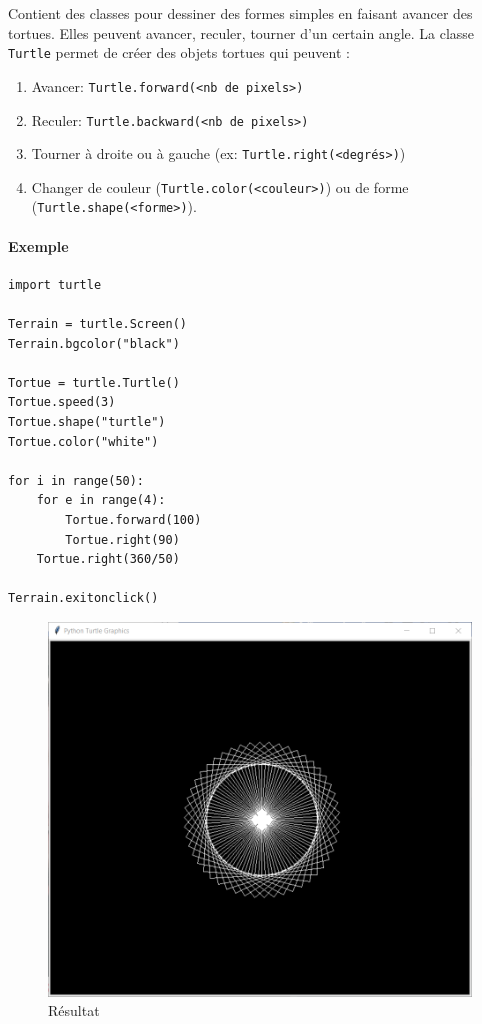 \documentclass[a4paper, 10pt]{article}
\begin{document}
Contient des classes pour dessiner des formes simples en faisant avancer des tortues. Elles peuvent avancer, reculer, tourner d'un certain angle.
La classe \texttt{Turtle} permet de créer des objets tortues qui peuvent :
\begin{enumerate}
        \item Avancer: \texttt{Turtle.forward(<nb de pixels>)}
        \item Reculer: \texttt{Turtle.backward(<nb de pixels>)}
        \item Tourner à droite ou à gauche (ex: \texttt{Turtle.right(<degrés>)})
        \item Changer de couleur (\texttt{Turtle.color(<couleur>)}) ou de forme (\texttt{Turtle.shape(<forme>)}).
\end{enumerate}

\paragraph{Exemple}
\begin{verbatim}
import turtle

Terrain = turtle.Screen()
Terrain.bgcolor("black")

Tortue = turtle.Turtle()
Tortue.speed(3)
Tortue.shape("turtle")
Tortue.color("white")

for i in range(50):
    for e in range(4):
        Tortue.forward(100)
        Tortue.right(90)
    Tortue.right(360/50)

Terrain.exitonclick()
\end{verbatim}

\begin{figure}[h]
\begin{center}
\includegraphics[scale=0.5]{turtle.PNG}
\caption*{Résultat}
\end{center}
\end{figure}
\end{document}

